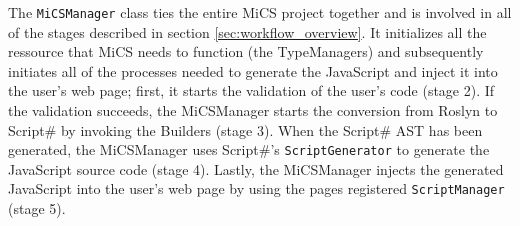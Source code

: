 The \texttt{MiCSManager} class ties the entire MiCS project together and is involved in all of the stages described in section \ref{sec:workflow_overview}. It initializes all the ressource that MiCS needs to function (the TypeManagers) and subsequently initiates all of the processes needed to generate the JavaScript and inject it into the user's web page; first, it starts the validation of the user's code (stage 2). If the validation succeeds, the MiCSManager starts the conversion from Roslyn to Script\# by invoking the Builders (stage 3). When the Script\# AST has been generated, the MiCSManager uses Script\#'s \texttt{ScriptGenerator} to generate the JavaScript source code (stage 4). Lastly, the MiCSManager injects the generated JavaScript into the user's web page by using the pages registered \texttt{ScriptManager} (stage 5). 

